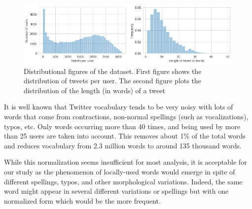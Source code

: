 \begin{figure}[t]
    \centering
    \includegraphics[width=\textwidth]{./images/dataset_histograms.png}
    \caption{Distributional figures of the dataset. First figure shows the distribution of tweets per user. The second figure plots the distribution of the length (in words) of a tweet} 
    \label{fig:tweets_distribution} 
 \end{figure}



It is well known that Twitter vocabulary tends to be very noisy \cite{kaufmann2010syntactic} with lots of words that come from contractions, non-normal spellings (such as vocalizations), typos, etc. Only words occurring more than 40 times, and being used by more than 25 users are taken into account. This removes about 1\% of the total words and reduces vocabulary from 2.3 million words to around 135 thousand words. 

While this normalization seems insufficient for most analysis, it is acceptable for our study as the phenomenon of locally-used words would emerge in spite of different spellings, typos, and other morphological variations. Indeed, the same word might appear in several different variations or spellings but with one normalized form which would be the more frequent.







